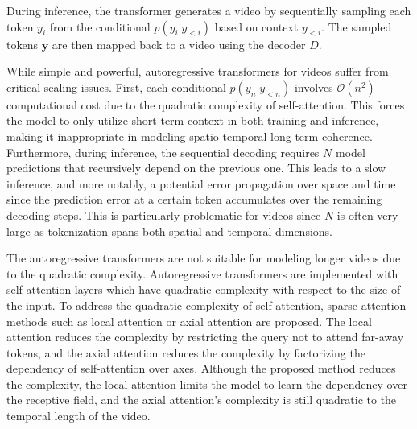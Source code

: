 \documentclass[10pt,twocolumn,letterpaper]{article}
\begin{document}
During inference, the transformer generates a video by sequentially sampling each token $y_i$ from the conditional $p(y_i|y_{<i})$ based on context $y_{<i}$.
The sampled tokens $\mathbf{y}$ are then mapped back to a video using the decoder $D$.

While simple and powerful, autoregressive transformers for videos suffer from critical scaling issues.
First, each conditional $p(y_n|y_{<n})$ involves $\mathcal{O}(n^2)$ computational cost due to the quadratic complexity of self-attention.
This forces the model to only utilize short-term context in both training and inference, making it inappropriate in modeling spatio-temporal long-term coherence.
Furthermore, during inference, the sequential decoding requires $N$ model predictions that recursively depend on the previous one.
This leads to a slow inference, and more notably, a potential error propagation over space and time since the prediction error at a certain token accumulates over the remaining decoding steps.
This is particularly problematic for videos since $N$ is often very large as tokenization spans both spatial and temporal dimensions.





\ifdefined{} \fi
\iffalse
The autoregressive transformers are not suitable for modeling longer videos due to the quadratic complexity. Autoregressive transformers are implemented with self-attention layers which have quadratic complexity with respect to the size of the input.
To address the quadratic complexity of self-attention, sparse attention methods such as local attention \cite{NUWA, BigBird, LongFormer} or axial attention \cite{Ho2019, GODIVA} are proposed. The local attention reduces the complexity by restricting the query not to attend far-away tokens, and the axial attention reduces the complexity by factorizing the dependency of self-attention over axes. Although the proposed method reduces the complexity, the local attention limits the model to learn the dependency over the receptive field, and the axial attention's complexity is still quadratic to the temporal length of the video.
\end{document}

